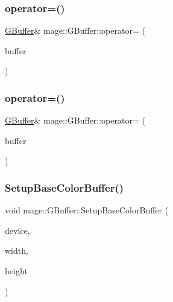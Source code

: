 \hypertarget{structmage_1_1_g_buffer_ac4b12cce6a06866958f3a674d7a7dcae}{}\label{structmage_1_1_g_buffer_ac4b12cce6a06866958f3a674d7a7dcae} 
\subsubsection{\texorpdfstring{operator=()}{operator=()}\hspace{0.1cm}{\footnotesize\ttfamily [1/2]}}
{\footnotesize\ttfamily \hyperlink{structmage_1_1_g_buffer}{G\+Buffer}\& mage\+::\+G\+Buffer\+::operator= (\begin{DoxyParamCaption}\item[{const \hyperlink{structmage_1_1_g_buffer}{G\+Buffer} \&}]{buffer }\end{DoxyParamCaption})\hspace{0.3cm}{\ttfamily [delete]}}

\hypertarget{structmage_1_1_g_buffer_ab1d4ae70de89c0549f54ee76b0b078c3}{}\label{structmage_1_1_g_buffer_ab1d4ae70de89c0549f54ee76b0b078c3} 
\subsubsection{\texorpdfstring{operator=()}{operator=()}\hspace{0.1cm}{\footnotesize\ttfamily [2/2]}}
{\footnotesize\ttfamily \hyperlink{structmage_1_1_g_buffer}{G\+Buffer}\& mage\+::\+G\+Buffer\+::operator= (\begin{DoxyParamCaption}\item[{\hyperlink{structmage_1_1_g_buffer}{G\+Buffer} \&\&}]{buffer }\end{DoxyParamCaption})\hspace{0.3cm}{\ttfamily [delete]}}

\hypertarget{structmage_1_1_g_buffer_a33402870130bb9b73e5a62b22d255a61}{}\label{structmage_1_1_g_buffer_a33402870130bb9b73e5a62b22d255a61} 
\subsubsection{\texorpdfstring{Setup\+Base\+Color\+Buffer()}{SetupBaseColorBuffer()}}
{\footnotesize\ttfamily void mage\+::\+G\+Buffer\+::\+Setup\+Base\+Color\+Buffer (\begin{DoxyParamCaption}\item[{I\+D3\+D11\+Device2 $\ast$}]{device,  }\item[{\hyperlink{namespacemage_a41c104c036fba3756a74e19f793eeaa1}{U32}}]{width,  }\item[{\hyperlink{namespacemage_a41c104c036fba3756a74e19f793eeaa1}{U32}}]{height }\end{DoxyParamCaption})\hspace{0.3cm}{\ttfamily [private]}}

